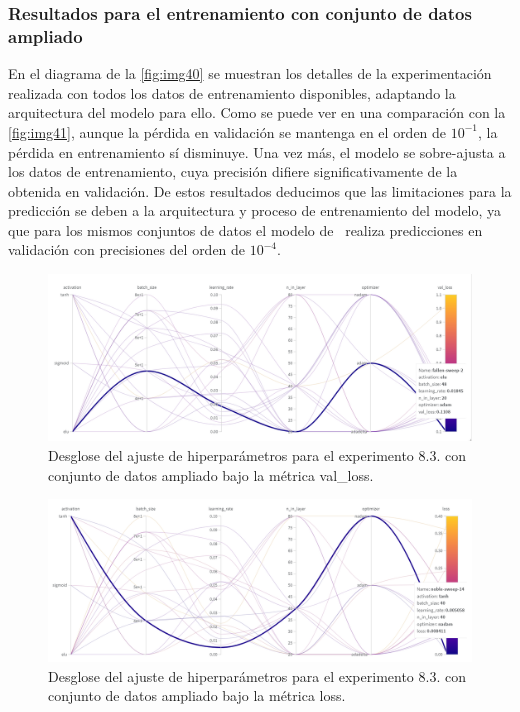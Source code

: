 \subsubsection{Resultados para el entrenamiento con conjunto de datos ampliado}

En el diagrama de la \autoref{fig:img40} se muestran los detalles de la experimentación realizada con todos los datos de entrenamiento disponibles, adaptando la arquitectura del modelo para ello. Como se puede ver en una comparación con la \autoref{fig:img41}, aunque la pérdida en validación se mantenga en el orden de $10^{-1}$, la pérdida en entrenamiento sí disminuye. Una vez más, el modelo se sobre-ajusta a los datos de entrenamiento, cuya precisión difiere significativamente de la obtenida en validación. De estos resultados deducimos que las limitaciones para la predicción se deben a la arquitectura y proceso de entrenamiento del modelo, ya que para los mismos conjuntos de datos el modelo de~\cite{lu2024deeponet} realiza predicciones en validación con precisiones del orden de $10^{-4}$. 

\begin{figure}[htbp]
    \centering
    \includegraphics[width=1\textwidth]{img/img40.png}
    \caption{Desglose del ajuste de hiperparámetros para el experimento 8.3. con conjunto de datos ampliado bajo la métrica val\_loss. }
    \label{fig:img40}
\end{figure}

\begin{figure}[htbp]
    \centering
    \includegraphics[width=1\textwidth]{img/img41.png}
    \caption{Desglose del ajuste de hiperparámetros para el experimento 8.3. con conjunto de datos ampliado bajo la métrica loss.}
    \label{fig:img41}
\end{figure}

